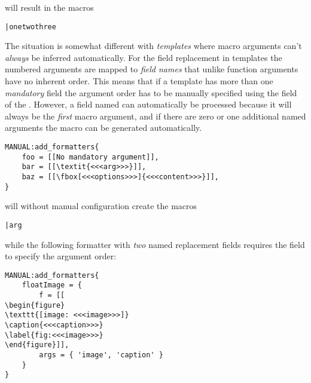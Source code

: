 \documentclass[12pt]{scrartcl}
\begin{document}
\noindent will result in the macros

\begin{itemize*}
\item \texttt{\foo}
\item \texttt{\bar{one}{two}{three}}
\item \texttt{}
\end{itemize*}

\noindent The situation is somewhat different with \emph{templates} where macro
arguments can't \emph{always} be inferred automatically.  For the field
replacement in templates the numbered arguments are mapped to \emph{field names}
that unlike function arguments have no inherent order.  This means that if a
template has more than one \emph{mandatory} field the argument order has to be
manually specified using the  field of the .  However, a field named  can automatically be
processed because it will always be the \emph{first} macro argument, and if
there are zero or one additional named arguments the macro can be generated
automatically.

\begin{verbatim}
MANUAL:add_formatters{
	foo = [[No mandatory argument]],
	bar = [[\textit{<<<arg>>>}]],
	baz = [[\fbox[<<<options>>>]{<<<content>>>}]],
}
\end{verbatim}

\noindent will without manual configuration create the macros

\begin{itemize*}
\item \texttt{\foo}
\item \texttt{\bar{arg}}
\item \texttt{}
\end{itemize*}

\noindent while the following formatter with \emph{two} named replacement fields requires the  field to specify the argument order:

\begin{verbatim}
MANUAL:add_formatters{
	floatImage = {
		f = [[
\begin{figure}
\texttt{[image: <<<image>>>]}
\caption{<<<caption>>>}
\label{fig:<<<image>>>}
\end{figure}]],
		args = { 'image', 'caption' }
	}
}
\end{verbatim}
\end{document}
